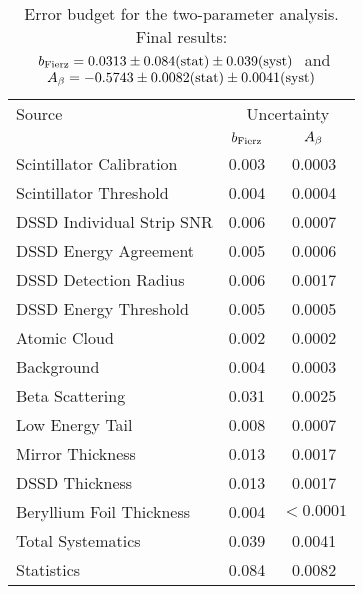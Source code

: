 



\begin{table}[h!!!!t]
	\begin{center}
	\begin{tabular}{ l  c  c  }
		\multicolumn{1}{l}{ Source} 		& \multicolumn{2}{c}{ \;\;\; \;\;\; Uncertainty \;\;\; \;\;\; }   
		\\
		\multicolumn{1}{l}{ } 				& \multicolumn{1}{c}{\;\; $b_{\mathrm{Fierz}}$}   & \multicolumn{1}{c}{$A_{\beta}$}   	
		\\  \hline
		Scintillator Calibration 			& 0.003								& 0.0003											
		\\
		Scintillator Threshold  			& 0.004 							& 0.0004 						
		\\
		DSSD Individual Strip SNR 			& 0.006								& 0.0007													
		\\
		DSSD Energy Agreement	  			& 0.005 							& 0.0006 						
		\\
		DSSD Detection Radius	  			& 0.006 							& 0.0017 						
		\\
		DSSD Energy Threshold	  			& 0.005 							& 0.0005 						
		\\
		Atomic Cloud			  			& 0.002 							& 0.0002 						
		\\
		Background				  			& 0.004 							& 0.0003 						
		\\
		Beta Scattering				  		& 0.031 							& 0.0025 						
		\\
		Low Energy Tail				  		& 0.008 							& 0.0007 						
		\\
		Mirror Thickness				  	& 0.013 							& 0.0017 						
		\\
		DSSD Thickness				 	 	& 0.013 							& 0.0017 						
		\\
		Beryllium Foil Thickness			& 0.004								& $\!\!\!\!\!\! < 0.0001$ 			
		\\  \hline
		\multicolumn{1}{l}{ Total Systematics} & \multicolumn{1}{c}{0.039}  & \multicolumn{1}{c}{0.0041}
		\\
		\multicolumn{1}{l}{ Statistics} 	   & \multicolumn{1}{c}{0.084}  & \multicolumn{1}{c}{0.0082}
	\end{tabular}
	\end{center}
	\caption[Error Budget]{Error budget for the two-parameter analysis.  Final results: 
	$\mbox{ $b_{\mathrm{Fierz}} = 0.0313 \pm 0.084(\textrm{stat}) \pm 0.039(\textrm{syst})$ }$ and $\mbox{ $A_{\beta} = -0.5743 \pm 0.0082(\textrm{stat}) \pm 0.0041(\textrm{syst})$ }$ }
	\label{table:budget}
\end{table}




